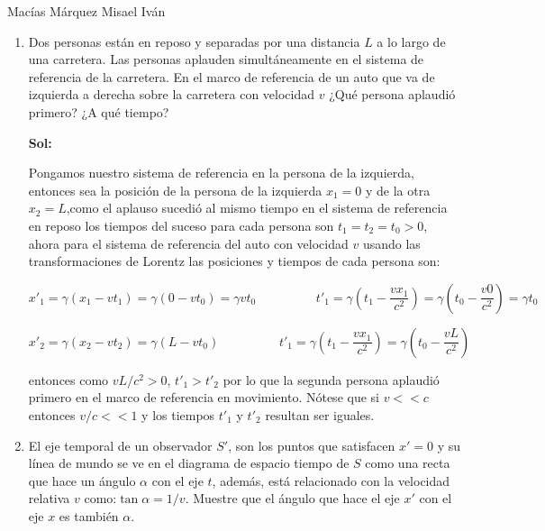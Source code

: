 \documentclass[12pt,a4paper]{article}
\begin{document}
Macías Márquez Misael Iván

\begin{enumerate}






\item Dos personas están en reposo y separadas por una distancia $L$ a lo largo de una carretera. Las personas aplauden simultáneamente en el sistema de referencia de la carretera. En el marco de referencia de un auto que va de izquierda a derecha sobre la carretera con velocidad $v$ ¿Qué persona aplaudió primero? ¿A qué tiempo?

\textbf{Sol:}

Pongamos nuestro sistema de referencia en la persona de la izquierda, entonces sea la posición de la persona de la izquierda $x_1= 0$ y de la otra $x_2=L$,como el aplauso sucedió al mismo tiempo en el sistema de referencia en reposo los tiempos del suceso para cada persona son $t_1 = t_2 = t_0 > 0$, ahora para el sistema de referencia del auto con velocidad $v$ usando las transformaciones de Lorentz las posiciones y tiempos de cada persona son:

\begin{equation*}
    x'_1 = \gamma (x_1 - v t_1)= \gamma (0 - v t_0) = \gamma v t_0 \hspace{2cm} t'_1 = \gamma (t_1 - \frac{vx_1}{c^2}) =  \gamma (t_0 - \frac{v0}{c^2}) = \gamma t_0
\end{equation*}

\begin{equation*}
    x'_2 = \gamma (x_2 - v t_2)= \gamma(L - vt_0) \hspace{2cm} t'_1 = \gamma (t_1 - \frac{vx_1}{c^2})=\gamma (t_0 - \frac{vL}{c^2})
\end{equation*}

entonces como $vL/c^2 > 0$, $t'_1 > t'_2$ por lo que la segunda persona aplaudió primero en el marco de referencia en movimiento. Nótese que si $v << c$ entonces $v/c << 1$ y los tiempos $t'_1$ y $t'_2$ resultan ser iguales.








\item El eje temporal de un observador $S'$, son los puntos que satisfacen $x'=0$ y su línea de mundo se ve en el diagrama de espacio tiempo de $S$ como una recta que hace un ángulo $\alpha$ con el eje $t$, además, está relacionado con la velocidad relativa $v$ como:$\tan{\alpha} = 1/v$. Muestre que el ángulo que hace el eje $x'$ con el eje $x$ es también $\alpha$.


\end{enumerate}
\end{document}
